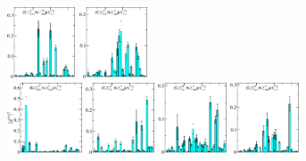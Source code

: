 \begin{figure}[H]
    \includegraphics[width=0.18\textwidth]{figures/sigmas/g2g/zfactors/zfactor_isotriplet_kbar_nucleon-G2g_1-P001-E-SS_2-P00-1-G1-SS_0.pdf}
    \includegraphics[width=0.18\textwidth]{figures/sigmas/g2g/zfactors/zfactor_isotriplet_kbar_nucleon-G2g_1-P011-A1-SS_3-P0-1-1-G-SS_0.pdf}\\
    \includegraphics[width=0.1975\textwidth]{figures/sigmas/g2g/zfactors/zfactor_isotriplet_kbar_nucleon-G2g_1-P011-A2-SS_0-P0-1-1-G-SS_0.pdf}
    \includegraphics[width=0.18\textwidth]{figures/sigmas/g2g/zfactors/zfactor_isotriplet_kbar_nucleon-G2g_1-P011-A2-SS_1-P0-1-1-G-SS_0.pdf}
    \includegraphics[width=0.18\textwidth]{figures/sigmas/g2g/zfactors/zfactor_isotriplet_kbar_nucleon-G2g_1-P011-B1-SS_1-P0-1-1-G-SS_0.pdf}
    \includegraphics[width=0.18\textwidth]{figures/sigmas/g2g/zfactors/zfactor_isotriplet_kbar_nucleon-G2g_1-P011-B2-SS_3-P0-1-1-G-SS_0.pdf}

\end{figure}
